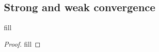 \subsection{Strong and weak convergence}

\begin{exercise}{1}
fill
\end{exercise}
\begin{proof}
fill
\end{proof}